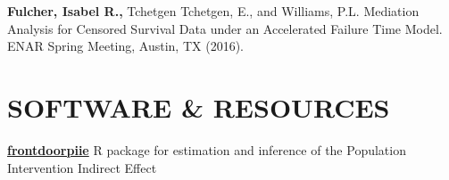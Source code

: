\documentclass[12pt]{article}
\begin{document}
\textbf{Fulcher, Isabel R.,} Tchetgen Tchetgen, E., and Williams, P.L. Mediation Analysis for Censored Survival Data under an Accelerated Failure Time Model. ENAR Spring Meeting, Austin, TX (2016). 

\section*{\textbf{{\large S}{OFTWARE}  {\large \&} {\large R}{ESOURCES} }}

{\bf \href{https://isabelfulcher.github.io/frontdoorpiie/}{frontdoorpiie}} R package for estimation and inference of the Population Intervention Indirect Effect 

\end{document}
